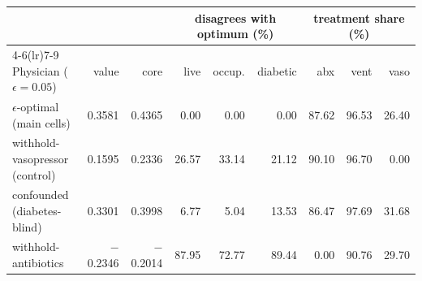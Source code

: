 \begin{tabular}{lrrrrrrrr}
\toprule
 & & & \multicolumn{3}{c}{disagrees with optimum (\%)} & \multicolumn{3}{c}{treatment share (\%)} \\
\cmidrule(lr){4-6}\cmidrule(lr){7-9}
Physician ($\epsilon{=}0.05$) & value & core & live & occup. & diabetic & abx & vent & vaso \\
\midrule
$\epsilon$-optimal (main cells) & 0.3581 & 0.4365 & 0.00 & 0.00 & 0.00 & 87.62 & 96.53 & 26.40 \\
withhold-vasopressor (control) & 0.1595 & 0.2336 & 26.57 & 33.14 & 21.12 & 90.10 & 96.70 & 0.00 \\
confounded (diabetes-blind) & 0.3301 & 0.3998 & 6.77 & 5.04 & 13.53 & 86.47 & 97.69 & 31.68 \\
withhold-antibiotics & $-$0.2346 & $-$0.2014 & 87.95 & 72.77 & 89.44 & 0.00 & 90.76 & 29.70 \\
\bottomrule
\end{tabular}
